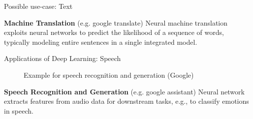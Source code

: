 \documentclass[11pt,compress,t,notes=noshow, xcolor=table]{beamer}
\begin{document}
\begin{frame} {Possible use-case: Text}
\begin{figure}
\centering
{}
\end{figure}
\textbf{Machine Translation} (e.g. google translate) 
Neural machine translation exploits neural networks to predict the likelihood of a sequence of words, typically modeling entire sentences in a single integrated model.
\end{frame}

\begin{frame} {Applications of Deep Learning: Speech}
\begin{figure}
\centering
{}
\caption{Example for speech recognition and generation (Google)}
\end{figure}
\textbf{Speech Recognition and Generation} (e.g. google assistant)
Neural network extracts features from audio data for downstream tasks, e.g., to classify emotions in speech.
\end{frame}
\end{document}
